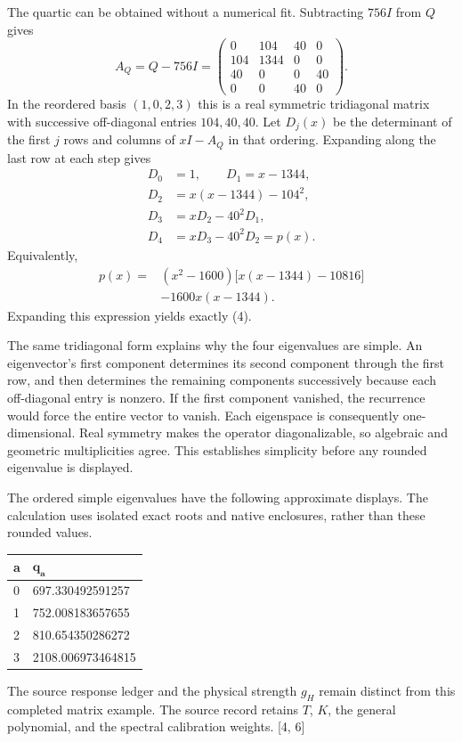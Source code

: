 \documentclass[10pt,twocolumn,letterpaper]{article}
\begin{document}
The quartic can be obtained without a numerical fit. Subtracting $756I$ from $Q$ gives
\[
A_Q=Q-756I=
\begin{pmatrix}
0&104&40&0\\
104&1344&0&0\\
40&0&0&40\\
0&0&40&0
\end{pmatrix}.
\]
In the reordered basis $(1,0,2,3)$ this is a real symmetric tridiagonal matrix with successive off-diagonal entries $104,40,40$. Let $D_j(x)$ be the determinant of the first $j$ rows and columns of $xI-A_Q$ in that ordering. Expanding along the last row at each step gives
\[
\begin{aligned}
D_0&=1,\qquad D_1=x-1344,\\
D_2&=x(x-1344)-104^2,\\
D_3&=xD_2-40^2D_1,\\
D_4&=xD_3-40^2D_2=p(x).
\end{aligned}
\]
Equivalently,
\[
\begin{aligned}
p(x)={}&(x^2-1600)\bigl[x(x-1344)-10816\bigr]\\
&-1600x(x-1344).
\end{aligned}
\]
Expanding this expression yields exactly (4).

The same tridiagonal form explains why the four eigenvalues are simple. An eigenvector's first component determines its second component through the first row, and then determines the remaining components successively because each off-diagonal entry is nonzero. If the first component vanished, the recurrence would force the entire vector to vanish. Each eigenspace is consequently one-dimensional. Real symmetry makes the operator diagonalizable, so algebraic and geometric multiplicities agree. This establishes simplicity before any rounded eigenvalue is displayed.


The ordered simple eigenvalues have the following approximate displays. The calculation uses isolated exact roots and native enclosures, rather than these rounded values.
\begin{center}
\small
\begin{tabular*}{\columnwidth}{@{\extracolsep{\fill}}ll@{}}
\toprule
\textbf{a} & $\boldsymbol{q_a}$\\
\midrule
0 & 697.330492591257\\
1 & 752.008183657655\\
2 & 810.654350286272\\
3 & 2108.006973464815\\
\bottomrule
\end{tabular*}
\end{center}
The source response ledger and the physical strength $g_H$ remain distinct from this completed matrix example. The source record retains $T$, $K$, the general polynomial, and the spectral calibration weights. [4, 6]
\end{document}
